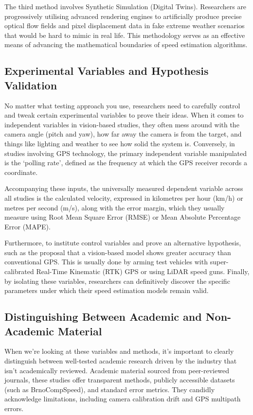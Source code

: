 The third method involves Synthetic Simulation (Digital Twins). Researchers are progressively utilising advanced rendering engines to artificially produce precise optical flow fields and pixel displacement data in fake extreme weather scenarios that would be hard to mimic in real life. This methodology serves as an effective means of advancing the mathematical boundaries of speed estimation algorithms.

\subsection{Experimental Variables and Hypothesis Validation}
No matter what testing approach you use, researchers need to carefully control and tweak certain experimental variables to prove their ideas. When it comes to independent variables in vision-based studies, they often mess around with the camera angle (pitch and yaw), how far away the camera is from the target, and things like lighting and weather to see how solid the system is. Conversely, in studies involving GPS technology, the primary independent variable manipulated is the `polling rate', defined as the frequency at which the GPS receiver records a coordinate.

Accompanying these inputs, the universally measured dependent variable across all studies is the calculated velocity, expressed in kilometres per hour (km/h) or metres per second (m/s), along with the error margin, which they usually measure using Root Mean Square Error (RMSE) or Mean Absolute Percentage Error (MAPE).

Furthermore, to institute control variables and prove an alternative hypothesis, such as the proposal that a vision-based model shows greater accuracy than conventional GPS. This is usually done by arming test vehicles with super-calibrated Real-Time Kinematic (RTK) GPS or using LiDAR speed guns. Finally, by isolating these variables, researchers can definitively discover the specific parameters under which their speed estimation models remain valid.

\subsection{Distinguishing Between Academic and Non-Academic Material}
When we're looking at these variables and methods, it's important to clearly distinguish between well-tested academic research driven by the industry that isn't academically reviewed. Academic material sourced from peer-reviewed journals, these studies offer transparent methods, publicly accessible datasets (such as BrnoCompSpeed), and standard error metrics. They candidly acknowledge limitations, including camera calibration drift and GPS multipath errors.

